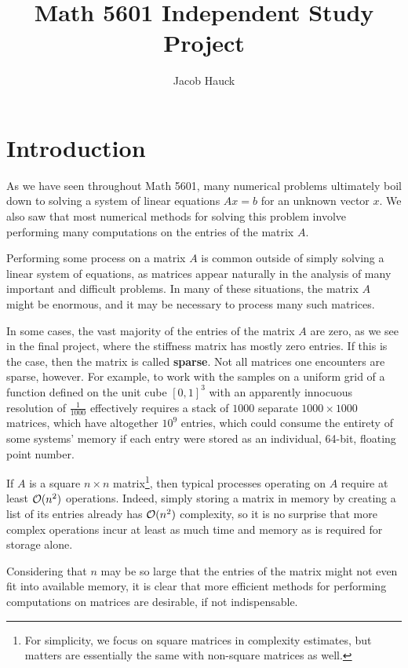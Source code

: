 \documentclass{article}
\author{Jacob Hauck}
\title{Math 5601 Independent Study Project}
\date{}
\begin{document}
	\maketitle
	
	\section{Introduction}
	
	
	As we have seen throughout Math 5601, many numerical problems ultimately boil down to solving a system of linear equations $Ax = b$ for an unknown vector $x$. We also saw that most numerical methods for solving this problem involve performing many computations on the entries of the matrix $A$.
	
	Performing some process on a matrix $A$ is common outside of simply solving a linear system of equations, as matrices appear naturally in the analysis of many important and difficult problems. In many of these situations, the matrix $A$ might be enormous, and it may be necessary to process many such matrices. 
	
	In some cases, the vast majority of the entries of the matrix $A$ are zero, as we see in the final project, where the stiffness matrix has mostly zero entries. If this is the case, then the matrix is called \textbf{sparse}. Not all matrices one encounters are sparse, however. For example, to work with the samples on a uniform grid of a function defined on the unit cube $[0,1]^3$ with an apparently innocuous resolution of $\frac{1}{1000}$ effectively requires a stack of $1000$ separate $1000\times 1000$ matrices, which have altogether $10^9$ entries, which could consume the entirety of some systems' memory if each entry were stored as an individual, 64-bit, floating point number.
	
	If $A$ is a square $n \times n$ matrix\footnote{For simplicity, we focus on square matrices in complexity estimates, but matters are essentially the same with non-square matrices as well.}, then typical processes operating on $A$ require at least $\mathcal{O}(n^2)$ operations. Indeed, simply storing a matrix in memory by creating a list of its entries already has $\mathcal{O}(n^2)$ complexity, so it is no surprise that more complex operations incur at least as much time and memory as is required for storage alone.
	
	Considering that $n$ may be so large that the entries of the matrix might not even fit into available memory, it is clear that more efficient methods for performing computations on matrices are desirable, if not indispensable.
	
\end{document}
